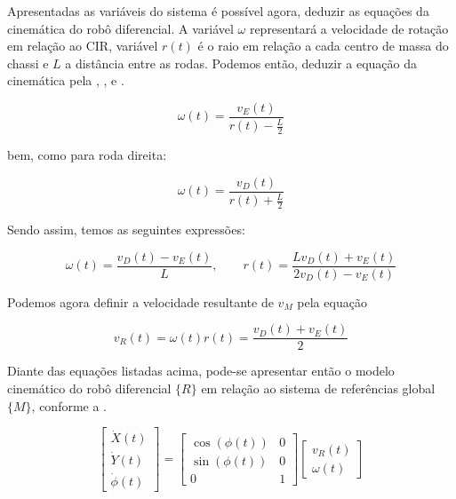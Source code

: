 Apresentadas as variáveis do sistema é possível agora, deduzir as equações da cinemática do robô diferencial. A variável $\omega$ representará a velocidade de rotação em relação ao $\text{CIR}$, variável $r(t)$ é o raio em relação a cada centro de massa do chassi e $L$ a distância entre as rodas. Podemos então, deduzir a equação da cinemática pela , ,  e .

\begin{equation}
    \omega(t) = \frac{v_{E}(t)}{r(t) - \displaystyle\frac{L}{2}}
    \label{eq:cinerd1}
\end{equation}

\noindent bem, como para roda direita:

\begin{equation}
    \omega(t) = \frac{v_{D}(t)}{r(t) + \frac{L}{2}}
    \label{eq:cinerd2}
\end{equation}

Sendo assim, temos as seguintes expressões:

\begin{equation}
    \omega(t) = \frac{v_{D}(t) - v_{E}(t)}{L}, \quad\quad r(t) = \frac{Lv_{D}(t) + v_{E}(t)}{2v_{D}(t) - v_{E}(t)}
    \label{eq:cinerd3}
\end{equation}

Podemos agora definir a velocidade resultante de $v_M$ pela equação

\begin{equation}
    v_R (t) = \omega(t) r(t) = \frac{v_{D}(t) + v_{E}(t)}{2}
    \label{eq:cinerd4}
\end{equation}

Diante das equações listadas acima, pode-se apresentar então o modelo cinemático do robô diferencial $\{R\}$ em relação ao sistema de referências global $\{M\}$, conforme a .

\begin{equation}
    \begin{bmatrix}
        \dot{X}(t) \\ \dot{Y}(t) \\ \dot{\phi}(t)
    \end{bmatrix}
    =
    \begin{bmatrix}
        \cos(\phi(t)) & 0 \\
        \sin(\phi(t)) & 0 \\
        0             & 1
    \end{bmatrix}
    \begin{bmatrix}
        v_R(t) \\ \omega(t)
    \end{bmatrix}
    \label{eq:cinerd5}
\end{equation}

